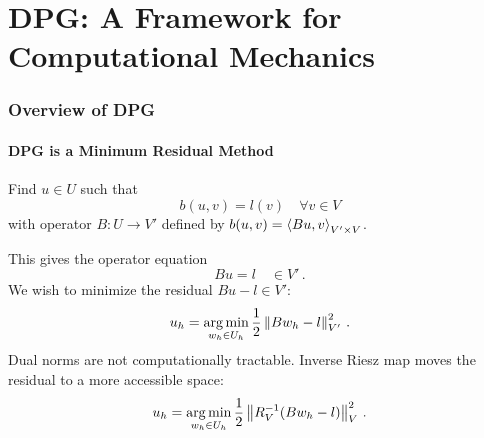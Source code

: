 \documentclass[18pt,xcolor=table]{beamer}
\begin{document}
%                                                                                                                      
%                                                                                                                      
% 
\section{DPG: A Framework for Computational Mechanics}
\begin{frame}[t]
\frametitle{Overview of DPG}
\framesubtitle{DPG is a Minimum Residual Method}
Find $u\in U$ such that
\[
b(u,v)=l(v)\quad\forall v\in V
\]
with operator $B:U\rightarrow V'$ defined by $b(u,v)=\left\langle Bu,v \right\rangle_{V'\times V}$.

This gives the operator equation 
\[
Bu=l\quad\in V'\,.
\]
We wish to minimize the residual $Bu-l\in V'$:
\[
u_h=\operatorname*{arg\,min}_{w_h\in U_h}\frac{1}{2}\left\| Bw_h-l \right\|^2_{V'}\,.
\]
Dual norms are not computationally tractable. 
Inverse Riesz map moves the residual to a more accessible space:
\[
u_h=\operatorname*{arg\,min}_{w_h\in U_h}\frac{1}{2}\left\| R_V^{-1}(Bw_h-l) \right\|^2_{V}\,.
\]
\end{frame}
\end{document}
